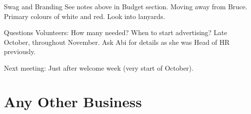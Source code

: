 \documentclass[11pt,hacksoc,agenda]{meetingmins}
\begin{document}
\begin{items}
  \item Swag and Branding
  \subitem See notes above in Budget section.
  \subitem Moving away from Bruce.
  \subitem Primary colours of white and red.
  \subitem Look into lanyards.

  \item Questions
  \subitem Volunteers: How many needed? When to start advertising?
  \subsubitem Late October, throughout November. Ask Abi for details as she was Head of HR previously.

  \item Next meeting: Just after welcome week (very start of October).
\end{items}

\section{Any Other Business}

\vspace{1em}
\end{document}
